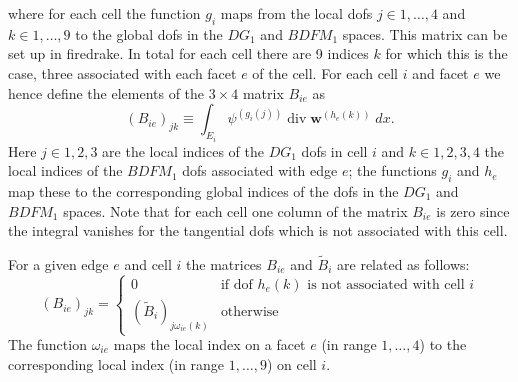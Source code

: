 \documentclass[12pt]{article}
\renewcommand{\vec}[1]{\boldsymbol{#1}}
\begin{document}
where for each cell the function $g_i$ maps from the local dofs $j\in1,\dots,4$ and $k\in1,\dots,9$ to the global dofs in the $DG_1$ and $BDFM_1$ spaces. This matrix can be set up in firedrake.
In total for each cell there are 9 indices $k$ for which this is the case, three associated with each facet $e$ of the cell. For each cell $i$ and facet $e$ we hence define the elements of the $3\times 4$ matrix $B_{ie}$ as
\begin{equation}
  (B_{ie})_{jk} \equiv \int_{E_i} \psi^{(g_i(j))} \operatorname{div}\vec{w}^{(h_e(k))}\; dx.
\end{equation}
Here $j\in1,2,3$ are the local indices of the $DG_1$ dofs in cell $i$ and $k\in1,2,3,4$ the local indices of the $BDFM_1$ dofs associated with edge $e$; the functions $g_i$ and $h_e$ map these to the corresponding global indices of the dofs in the $DG_1$ and $BDFM_1$ spaces. Note that for each cell one column of the matrix $B_{ie}$ is zero since the integral vanishes for the tangential dofs which is not associated with  this cell.

For a given edge $e$ and cell $i$ the matrices $B_{ie}$ and $\tilde{B}_i$ are related as follows:
\begin{equation}
  \left(B_{ie}\right)_{jk} = \begin{cases}
  0 & \text{if dof $h_e(k)$ is not associated with cell $i$} \\
  \left(\tilde{B}_i\right)_{j\omega_{ie}(k)} & \text{otherwise}
\end{cases}
\end{equation}
The function $\omega_{ie}$ maps the local index on a facet $e$ (in range $1,\dots,4$) to the corresponding local index (in range $1,\dots,9$) on cell $i$.
\end{document}
